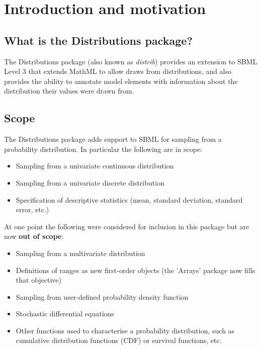 \documentclass[draftspec]{sbmlpkgspec}
\newcommand{\distribshort}{\emph{distrib}\xspace}
\newcommand{\distrib}{Distributions\xspace}
\begin{document}
\clearpage


\section{Introduction and motivation}

\subsection{What is the Distributions package?}

The \distrib package (also known as \distribshort) provides an extension to SBML Level 3 that extends MathML to allow draws from distributions, and also provides the ability to annotate model elements with information about the distribution their
values were drawn from. 

\subsection{Scope}

The \distrib package adds support to SBML for sampling from a
probability distribution. In particular the following are in scope:

\begin{itemize}
\item Sampling from a univariate continuous distribution
\item Sampling from a univariate discrete distribution
\item Specification of descriptive statistics (mean, standard
  deviation, standard error, etc.)
\end{itemize}

At one point the following were considered for inclusion in this
package but are now \textbf{out of scope}:

\begin{itemize}
\item Sampling from a multivariate distribution
\item Definitions of ranges as new first-order objects (the 'Arrays' package now fills that objective)
\item Sampling from user-defined probability density function
\item Stochastic differential equations
\item Other functions used to characterise a probability distribution,
  such as cumulative distribution functions (CDF) or survival functions, etc.
\end{itemize}
\end{document}
